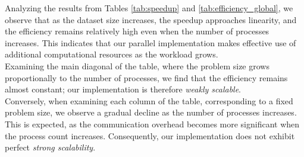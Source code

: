 Analyzing the results from Tables \ref{tab:speedup} and \ref{tab:efficiency_global}, we observe that as the dataset size increases, the speedup approaches linearity, and the efficiency remains relatively high even when the number of processes increases.
This indicates that our parallel implementation makes effective use of additional computational resources as the workload grows.
\\Examining the main diagonal of the table, where the problem size grows proportionally to the number of processes, we find that the efficiency remains almost constant; our implementation is therefore \emph{weakly scalable}.
\\Conversely, when examining each column of the table, corresponding to a fixed problem size, we observe a gradual decline as the number of processes increases. This is expected, as the communication overhead becomes more significant when the process count increases. Consequently, our implementation does not exhibit perfect \emph{strong scalability}.
